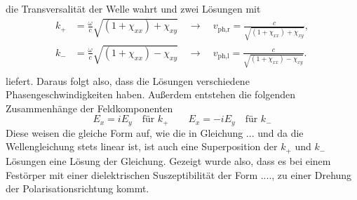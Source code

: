 die Transversalität der Welle wahrt und zwei Lösungen mit
\begin{align*}
    k_+ &= \frac{\omega}{c} \sqrt{(1+\chi_{xx})+ \chi_{xy}} \quad \to \quad v_{\text{ph,r}} = \frac{c}{\sqrt{(1+\chi_{xx})+ \chi_{xy}}}, \\
    k_- &= \frac{\omega}{c} \sqrt{(1+\chi_{xx})- \chi_{xy}} \quad \to \quad v_{\text{ph,l}} = \frac{c}{\sqrt{(1+\chi_{xx})- \chi_{xy}}}.\\
\end{align*}
liefert. Daraus folgt also, dass die Lösungen verschiedene Phasengeschwindigkeiten haben.
Außerdem entstehen die folgenden Zusammenhänge der Feldkomponenten
\begin{equation*}
    E_x = i E_y \quad \text{für } k_+ \quad \quad E_x = -i E_y \quad \text{für } k_-
\end{equation*}
Diese weisen die gleiche Form auf, wie die in Gleichung ... und da die Wellengleichung stets linear ist, ist auch eine Superposition der $k_+$ und $k_-$ Lösungen 
eine Lösung der Gleichung. Gezeigt wurde also, dass es bei einem Festörper mit einer dielektrischen Suszeptibilität der Form ...., zu einer Drehung der Polarisationsrichtung
kommt.

